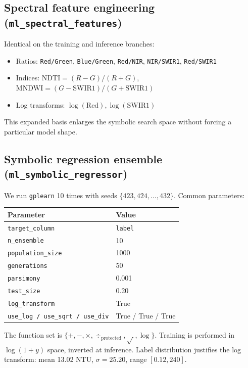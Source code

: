 \documentclass[11pt,a4paper]{article}
\begin{document}
\subsection{Spectral feature engineering (\texttt{ml\_spectral\_features})}
\label{sec:specfeat}
Identical on the training and inference branches:
\begin{itemize}
    \item Ratios: \texttt{Red/Green}, \texttt{Blue/Green}, \texttt{Red/NIR}, \texttt{NIR/SWIR1}, \texttt{Red/SWIR1}
    \item Indices: $\textrm{NDTI} = (R-G)/(R+G)$, $\textrm{MNDWI} = (G - \textrm{SWIR1})/(G + \textrm{SWIR1})$
    \item Log transforms: $\log(\textrm{Red}), \log(\textrm{SWIR1})$
\end{itemize}
This expanded basis enlarges the symbolic search space without forcing a particular model shape.

\subsection{Symbolic regression ensemble (\texttt{ml\_symbolic\_regressor})}
\label{sec:gp}
We run \texttt{gplearn} 10 times with seeds $\{423, 424, \dots, 432\}$. Common parameters:

\begin{center}
\small
\begin{tabular}{ll}
\toprule
Parameter & Value \\
\midrule
\texttt{target\_column} & \texttt{label} \\
\texttt{n\_ensemble} & 10 \\
\texttt{population\_size} & \num{1000} \\
\texttt{generations} & 50 \\
\texttt{parsimony} & 0.001 \\
\texttt{test\_size} & 0.20 \\
\texttt{log\_transform} & True \\
\texttt{use\_log / use\_sqrt / use\_div} & True / True / True \\
\bottomrule
\end{tabular}
\end{center}

The function set is $\{+, -, \times, \div_{\textrm{protected}}, \sqrt{\,}, \log\}$. Training is performed in $\log(1+y)$ space, inverted at inference. Label distribution justifies the log transform: mean 13.02 NTU, $\sigma = 25.20$, range $[0.12, 240]$.
\end{document}
